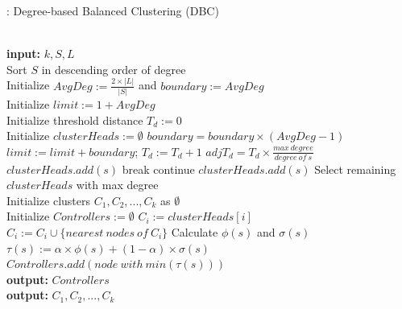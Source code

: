 \documentclass{IEEEtran}
\begin{document}
	\begin{algorithm}
		\caption{: Degree-based Balanced Clustering (DBC)}\label{algo:dbc}
		\begin{algorithmic}[1]
			 \\
			\textbf{input:} $k,S,L$ \\
			Sort $S$ in descending order of degree \\
			Initialize $AvgDeg := \frac{2\times |L|}{|S|}$ and $boundary:=AvgDeg$ \\
			Initialize $limit:=1+AvgDeg$ \\
			Initialize threshold distance $T_d := 0$ \\
			Initialize $clusterHeads := \emptyset$
			\State $boundary=boundary\times (AvgDeg-1)$
			\State $limit:=limit + boundary$; $T_d:=T_d+1$
			\EndWhile
			\State $adjT_d=T_d\times \frac{max~degree}{degree~of~s}$
			\State $clusterHeads.add(s)$
			 break
			\State continue
			\Else
			\State $clusterHeads.add(s)$
			\EndIf
			\EndFor
			\State Select remaining $clusterHeads$ with max degree
			\EndIf \\
			Initialize clusters $C_1,C_2,...,C_{k}$ as $\emptyset$ \\
			Initialize $Controllers:=\emptyset$
			\State $C_i:={clusterHeads[i]}$
			\State $C_i:=C_i \cup \{nearest~nodes~of~C_i\}$
			\EndFor
			\State Calculate $\phi(s)$ and $\sigma(s)$
			\State $\tau(s) := \alpha \times \phi(s) + (1-\alpha) \times \sigma(s)$
			\EndFor
			\State $Controllers.add(node~with~min(\tau(s)))$
			\EndFor \\
			\textbf{output:} $Controllers$ \\
			\textbf{output:} $C_1,C_2,...,C_{k}$
			\EndProcedure
		\end{algorithmic}
	\end{algorithm}
	
\end{document}
